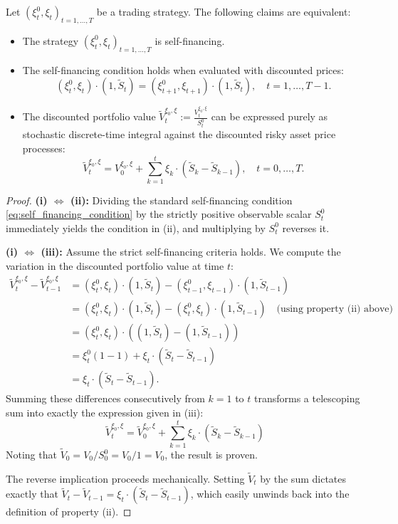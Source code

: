 \begin{proposition} \label{prop:self_financing_equiv}
Let $(\xi_t^0, \xi_t)_{t=1, \dots, T}$ be a trading strategy. The following claims are equivalent:
\begin{itemize}
    \item[(i)] The strategy $(\xi_t^0, \xi_t)_{t=1, \dots, T}$ is self-financing.
    \item[(ii)] The self-financing condition holds when evaluated with discounted prices:
    $$
    \left(\xi_t^0, \xi_t\right) \cdot \left(1, \tilde{S}_t\right) = \left(\xi_{t+1}^0, \xi_{t+1}\right) \cdot \left(1, \tilde{S}_t\right), \quad t=1, \dots, T-1.
    $$
    \item[(iii)] The discounted portfolio value $\tilde{V}_t^{\xi_0, \xi} := \frac{V_t^{\xi_0, \xi}}{S_t^0}$ can be expressed purely as stochastic discrete-time integral against the discounted risky asset price processes:
    $$
    \tilde{V}_t^{\xi_0, \xi} = V_0^{\xi_0, \xi} + \sum_{k=1}^t \xi_k \cdot (\tilde{S}_k - \tilde{S}_{k-1}), \quad t=0, \dots, T.
    $$
\end{itemize}
\end{proposition}

\begin{proof}
\textbf{(i) $\iff$ (ii):} Dividing the standard self-financing condition \eqref{eq:self_financing_condition} by the strictly positive observable scalar $S_t^0$ immediately yields the condition in (ii), and multiplying by $S_t^0$ reverses it.

\textbf{(i) $\iff$ (iii):} Assume the strict self-financing criteria holds. We compute the variation in the discounted portfolio value at time $t$:
\begin{align*}
\tilde{V}_t^{\xi_0, \xi} - \tilde{V}_{t-1}^{\xi_0, \xi} &= \left(\xi_t^0, \xi_t\right) \cdot \left(1, \tilde{S}_t\right) - \left(\xi_{t-1}^0, \xi_{t-1}\right) \cdot \left(1, \tilde{S}_{t-1}\right) \\
&= \left(\xi_t^0, \xi_t\right) \cdot \left(1, \tilde{S}_t\right) - \left(\xi_t^0, \xi_t\right) \cdot \left(1, \tilde{S}_{t-1}\right) \quad \text{(using property (ii) above)}\\
&= \left(\xi_t^0, \xi_t\right) \cdot \left(\left(1, \tilde{S}_t\right) - \left(1, \tilde{S}_{t-1}\right)\right) \\
&= \xi_t^0(1 - 1) + \xi_t \cdot (\tilde{S}_t - \tilde{S}_{t-1}) \\
&= \xi_t \cdot (\tilde{S}_t - \tilde{S}_{t-1}).
\end{align*}
Summing these differences consecutively from $k=1$ to $t$ transforms a telescoping sum into exactly the expression given in (iii):
$$
\tilde{V}_t^{\xi_0, \xi} = \tilde{V}_0^{\xi_0, \xi} + \sum_{k=1}^t \xi_k \cdot (\tilde{S}_k - \tilde{S}_{k-1})
$$
Noting that $\tilde{V}_0 = V_0 / S_0^0 = V_0 / 1 = V_0$, the result is proven. 

The reverse implication proceeds mechanically. Setting $\tilde{V}_t$ by the sum dictates exactly that $\tilde{V}_t - \tilde{V}_{t-1} = \xi_t \cdot (\tilde{S}_t - \tilde{S}_{t-1})$, which easily unwinds back into the definition of property (ii).
\end{proof}


